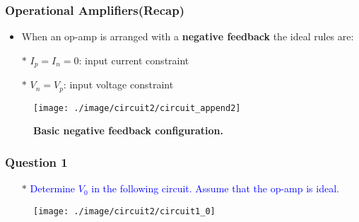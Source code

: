 \documentclass{beamer}
\newcommand{\blue}[1]{\textcolor{blue}{#1}}
\begin{document}
\begin{frame}
\frametitle{Operational Amplifiers(Recap)}

\begin{itemize}
  \item When an op-amp is arranged with a {\bf negative feedback} the ideal rules are: 
  \item[$\ast$] $I_p = I_n = 0$: input current constraint
  \item[$\ast$] $V_n = V_p$: \hspace{4 mm}input voltage constraint
\end{itemize}

\begin{figure}[H]
  \centering
  \texttt{[image: ./image/circuit2/circuit\_append2]}
  \caption{{\bf Basic negative feedback configuration. }}
\end{figure}


\end{frame}

\begin{frame}
\frametitle{Question 1}

\begin{itemize} \itemsep1pt \parskip0pt 
  \item[$\ast$] \blue{Determine $V_0$ in the following circuit. Assume that the op-amp is ideal.}
\end{itemize}



\begin{figure}[H]
  \centering
  \texttt{[image: ./image/circuit2/circuit1\_0]}
\end{figure}


\end{frame}
\end{document}
